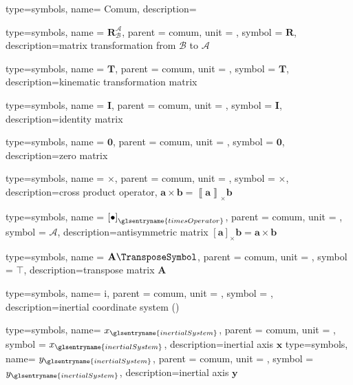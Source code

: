 {type=symbols,
	name= {Comum},
	description={}
}

{type=symbols,
	name = {\ensuremath{{\mathbf{R}}_{\mathcal{B}}^{\mathcal{A}}}},
	parent = {comum},
	unit = \unexpanded{},
	symbol = \ensuremath{\mathbf{R}},
	description={matrix transformation from $\mathcal{B}$ to $\mathcal{A}$}
}

{type=symbols,
	name = \ensuremath{{\mathbf{T}}},
	parent = {comum},
	unit = \unexpanded{},
	symbol = \ensuremath{\mathbf{T}},
	description={kinematic transformation matrix}
}

{type=symbols,
	name = {\ensuremath{\boldsymbol{I}}},
	parent = {comum},
	unit = \unexpanded{},
	symbol = \ensuremath{\boldsymbol{I}},
	description={identity matrix}
}

{type=symbols,
	name = {\ensuremath{\boldsymbol{0}}},
	parent = {comum},
	unit = \unexpanded{},
	symbol = \ensuremath{\boldsymbol{0}},
	description={zero matrix}
}

{type=symbols,
	name = \ensuremath{\times},
	parent = {comum},
	unit = \unexpanded{},
	symbol = \ensuremath{\times},
	description={cross product operator, $\boldsymbol{a}\times\boldsymbol{b}=\left\llbracket \boldsymbol{a}\right\rrbracket_{\times} \boldsymbol{b}$}
}

{type=symbols,
	name = \ensuremath{{\left[\bullet\right]}_\glsentryname{timesOperator}},
	parent = {comum},
	unit = \unexpanded{},
	symbol = \ensuremath{\mathcal{A}},
	description={antisymmetric matrix $\left[\boldsymbol{a}\right]_{\times}\boldsymbol{b}=\boldsymbol{a}\times\boldsymbol{b}$}
}

{type=symbols,
	name = \ensuremath{\mathbf{A}\TransposeSymbol},
	parent = {comum},
	unit = \unexpanded{},
	symbol = \ensuremath{\intercal},
	description={transpose matrix $\mathbf{A}$}
}


{type=symbols,
	name= \ensuremath{\mathrm{i}},
	parent = {comum},
	unit = \unexpanded{},
	symbol = ,
	description={inertial coordinate system ()}
}

{type=symbols,
	name= \ensuremath{x_{\glsentryname{inertialSystem}}},
	parent = {comum},
	unit = \unexpanded{},
	symbol = \ensuremath{x_{\glsentryname{inertialSystem}}},
	description={inertial axis $\mathbf{x}$}
}
{type=symbols,
	name= \ensuremath{y_{\glsentryname{inertialSystem}}},
	parent = {comum},
	unit = \unexpanded{},
	symbol = \ensuremath{y_{\glsentryname{inertialSystem}}},
	description={inertial axis $\mathbf{y}$}
}

